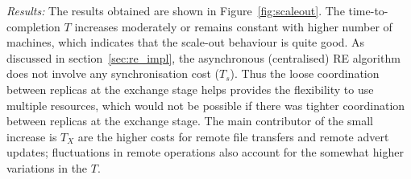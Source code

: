 \documentclass{rspublic}
\newcommand{\jhanote}[1]{ {\textcolor{red} { ***shantenu: #1 }}}
\newcommand{\alnote}[1]{ {\textcolor{blue} { ***andre: #1 }}}
\newcommand{\alnote}[1]{}
\newcommand{\jhanote}[1]{}
\begin{document}
{\it Results:} The results obtained are shown in
Figure~\ref{fig:scaleout}.  The time-to-completion $T$ increases
moderately or remains constant with higher number of machines, which
indicates that the scale-out behaviour is quite good.  As discussed in
section~\ref{sec:re_impl}, the asynchronous (centralised) RE algorithm
does not involve any synchronisation cost ($T_s$). Thus the loose
coordination between replicas at the exchange stage helps provides the
flexibility to use multiple resources, which would not be possible if
there was tighter coordination between replicas at the exchange stage.
The main contributor of the small increase is $T_X$ are the higher
costs for remote file transfers and remote advert updates;
fluctuations in remote operations also account for the somewhat higher
variations in the $T$.





\end{document}
